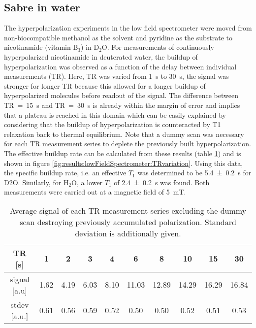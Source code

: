     \subsection{Sabre in water}
    The hyperpolarization experiments in the low field spectrometer were moved from non-biocompatible methanol as the solvent and pyridine as the substrate to nicotinamide (vitamin B$_3$) in D$_2$O. For measurements of continuously hyperpolarized nicotinamide in deuterated water, the buildup of hyperpolarization was observed as a function of the delay between individual measurements (TR). Here, TR was varied from \SI{1}{\second} to \SI{30}{\second}, the signal was stronger for longer TR because this allowed for a longer buildup of hyperpolarized molecules before readout of the signal. The difference between TR~=~\SI{15}{\second} and TR~=~\SI{30}{\second} is already within the margin of error and implies that a plateau is reached in this domain which can be easily explained by considering that the buildup of hyperpolarization is counteracted by T1 relaxation back to thermal equilibrium. Note that a dummy scan was necessary for each TR measurement series to deplete the previously built hyperpolarization. The effective buildup rate can be calculated from these results (table \ref{table:results:TRvariation}) and is shown in figure \ref{fig:results:lowFieldSpectrometer:TRvariation}. Using this data, the specific buildup rate, i.e. an effective $T_1$ was determined to be \SI{5.4\pm 0.2}{\second} for D2O. Similarly, for $\mathrm{H}_2\mathrm{O}$, a lower $T_1$ of \SI{2.4\pm0.2}{\second} was found. Both measurements were carried out at a magnetic field of \SI{5}{\milli\tesla}.
        \begin{table}
            \centering
            \begin{tabular}{|c|ccccccccc|}
                \hline
                TR [s] & 1 & 2 & 3 & 4 & 6 & 8 & 10 & 15 & 30 \\
                \hline
                signal [a.u] & 1.62 & 4.19 & 6.03 & 8.10 & 11.03 & 12.89 & 14.29 & 16.29 & 16.84\\
                stdev [a.u.] & 0.61 & 0.56 & 0.59 & 0.52 & 0.50 & 0.50& 0.52 & 0.51 & 0.53\\
                \hline
            \end{tabular}
            \caption[TR-variation results]{Average signal of each TR measurement series excluding the dummy scan destroying previously accumulated polarization. Standard deviation is additionally given.}
            \label{table:results:TRvariation}
        \end{table}
